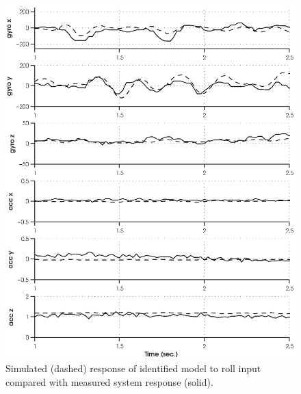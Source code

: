 \newpage
\begin{figure}[htb!]
	\centering
	\includegraphics{../fig/sim_1760_roll.eps}
	\caption{Simulated (dashed) response of identified model to roll input compared with measured system response (solid).}
\end{figure}\clearpage

